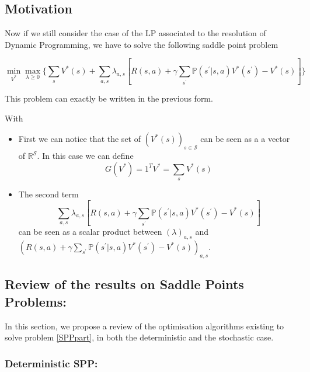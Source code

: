 \documentclass[12pt,reqno]{amsart}
\numberwithin{equation}{section}
\begin{document}
\subsection{Motivation}

Now if we still consider the case of the LP associated to the resolution of Dynamic Programming,
we have to solve the following saddle point problem

$$
\min_{V^{*}}\max_{\lambda \geq 0}\{ \sum_{s} V^{*}(s) + \sum_{a,s}\lambda_{a,s}[R(s,a) + \gamma \sum_{s^{'}}\mathbb{P}(s^{'}| s,a )V^{*}(s^{'}) - V^{*}(s)] \}
$$

This problem can exactly be written in the previous form.


With 

\begin{itemize}
\item First we can notice that the set of $(V^{*}(s))_{s \in \mathcal{S}}$ 
can be seen as a a vector of $\mathbb{R}^{\mathcal{S}}$. In this case we can define
$$G(V^{*}) = 1^{T}V^{*} = \sum_{s} V^{*}(s)$$
\item The second term 
$$
\sum_{a,s}\lambda_{a,s}[R(s,a) + \gamma \sum_{s^{'}}\mathbb{P}(s^{'}| s,a )V^{*}(s^{'}) - V^{*}(s)]
$$
can be seen as a scalar product between $(\lambda)_{a,s}$ and $(R(s,a) + \gamma \sum_{s^{'}}\mathbb{P}(s^{'}| s,a )V^{*}(s^{'}) - V^{*}(s))_{a,s}$.

\end{itemize}

\subsection{ Review of the results on Saddle Points Problems: }


In this section, we propose a review of the optimisation algorithms existing to solve problem \ref{SPPpart}, in both the deterministic and the stochastic case.

\subsubsection{Deterministic SPP: }
\end{document}
